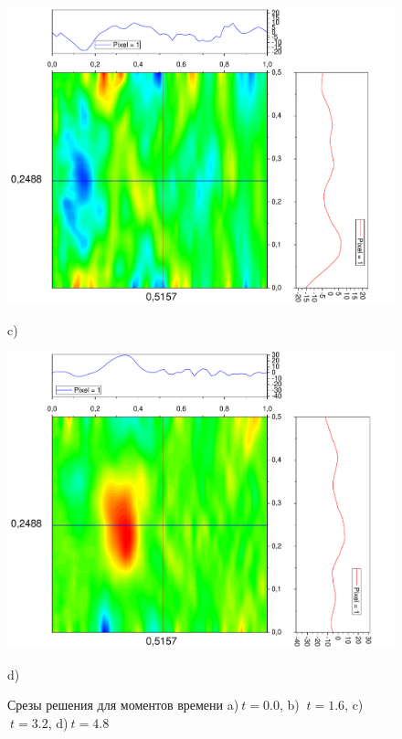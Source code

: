\documentclass[a4paper,12pt]{article}
\begin{document}
\begin{figure}[h!]
\begin{center}
\begin{minipage}[h]{0.24\linewidth}
		\end{minipage}
		\begin{minipage}[h]{0.24\linewidth}
			\includegraphics[width=\textwidth]{graphs/graphs_a/v2/wave_t-16_v2_srez} \begin{center}	c)	\end{center}
		\end{minipage}
		\begin{minipage}[h]{0.24\linewidth}
			\includegraphics[width=\textwidth]{graphs/graphs_a/v2/wave_t-24_v2_srez} \begin{center}	d)	\end{center}
		\end{minipage}
	\end{center}
	\caption{Срезы решения для моментов времени a)$\ t = 0.0$, b) $\ t = 1.6$, c)$\ t = 3.2$, d)$\ t = 4.8$}
\end{figure}
\end{document}
